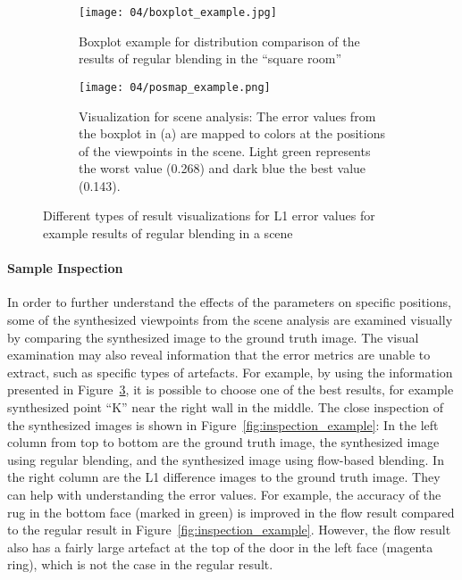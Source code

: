 \begin{figure}
\centering
    \hfill
    \begin{subfigure}[c]{0.5\textwidth}
            \centering
            \texttt{[image: 04/boxplot\_example.jpg]}
            \caption{Boxplot example for distribution comparison of the results of regular blending in the ``square room''} \label{fig:boxplot_example}
    \end{subfigure}%
    \hfill
    \begin{subfigure}[c]{0.5\textwidth}
            \centering
            \texttt{[image: 04/posmap\_example.png]}
            \caption{Visualization for scene analysis: The error values from the boxplot in (a) are mapped to colors at the positions of the viewpoints in the scene. Light green represents the worst value (0.268) and dark blue the best value (0.143).} \label{fig:posmap_example}
    \end{subfigure}
    \hfill
  \caption[Different types of result visualizations for L1 error values]{Different types of result visualizations for L1 error values for example results of regular blending in a scene}
\end{figure}

\paragraph{Sample Inspection}
In order to further understand the effects of the parameters on specific positions, some of the synthesized viewpoints from the scene analysis are examined visually by comparing the synthesized image to the ground truth image. The visual examination may also reveal information that the error metrics are unable to extract, such as specific types of artefacts. For example, by using the information presented in Figure~\ref{fig:posmap_example}, it is possible to choose one of the best results, for example synthesized point ``K'' near the right wall in the middle. The close inspection of the synthesized images is shown in Figure~\ref{fig:inspection_example}: In the left column from top to bottom are the ground truth image, the synthesized image using regular blending, and the synthesized image using flow-based blending. In the right column are the L1 difference images to the ground truth image. They can help with understanding the error values. For example, the accuracy of the rug in the bottom face (marked in green) is improved in the flow result compared to the regular result in Figure~\ref{fig:inspection_example}. However, the flow result also has a fairly large artefact at the top of the door in the left face (magenta ring), which is not the case in the regular result.

